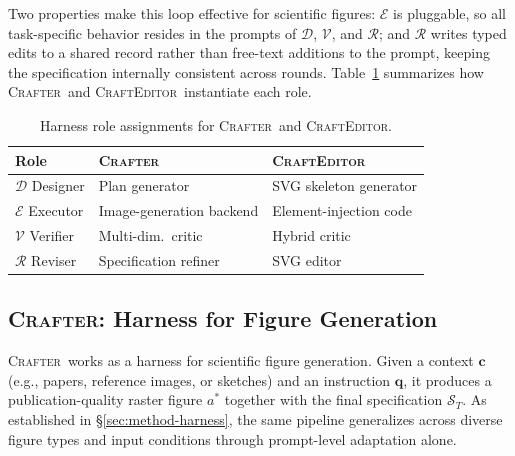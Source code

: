 \documentclass{article}
\newcommand{\Crafter}{\textsc{Crafter}\xspace}
\newcommand{\Editor}{\textsc{CraftEditor}\xspace}
\begin{document}
Two properties make this loop effective for scientific figures:
$\mathcal{E}$ is pluggable, so all task-specific behavior resides in the
prompts of $\mathcal{D}$, $\mathcal{V}$, and $\mathcal{R}$; and
$\mathcal{R}$ writes typed edits to a shared record rather than
free-text additions to the prompt, keeping the specification internally
consistent across rounds. Table~\ref{tab:harness-roles} summarizes how
\Crafter\ and \Editor\ instantiate each role.

\begin{table}[t]
\centering
\small
\caption{Harness role assignments for \Crafter\ and \Editor.}
\label{tab:harness-roles}
\begin{tabular}{@{}lll@{}}
\toprule
Role & \Crafter & \Editor \\
\midrule
$\mathcal{D}$ Designer  & Plan generator        & SVG skeleton generator \\
$\mathcal{E}$ Executor  & Image-generation backend & Element-injection code \\
$\mathcal{V}$ Verifier  & Multi-dim.\ critic    & Hybrid critic \\
$\mathcal{R}$ Reviser   & Specification refiner & SVG editor \\
\bottomrule
\end{tabular}
\end{table}

\subsection{\Crafter: Harness for Figure Generation}
\label{sec:method-crafter}


\Crafter\ works as a harness for scientific figure generation. Given a context $\mathbf{c}$ (e.g., papers, reference images, or sketches) and an instruction $\mathbf{q}$, it produces a publication-quality raster figure $a^*$ together with the final specification $\mathcal{S}_T$. 
As established in \S\ref{sec:method-harness}, the same pipeline
generalizes across diverse figure types and input conditions through
prompt-level adaptation alone.
\end{document}
